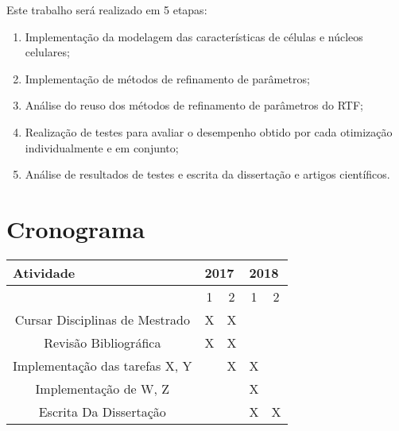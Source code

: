 \documentclass[a4paper,10pt]{article}
\begin{document}
Este trabalho será realizado em 5 etapas:
\begin{enumerate}
	\item Implementação da modelagem das características de células e núcleos celulares;
	\item Implementação de métodos de refinamento de parâmetros;
	\item Análise do reuso dos métodos de refinamento de parâmetros do RTF;
	\item Realização de testes para avaliar o desempenho obtido por cada otimização individualmente e em conjunto;
	\item Análise de resultados de testes e escrita da dissertação e artigos científicos.
\end{enumerate}


\section{Cronograma}
\begin{table}[!h]
	\centering
	\label{my-label}
	\begin{tabular}{|c|c|c|c|c|}
		\hline
		\multicolumn{1}{|l|}{Atividade} & \multicolumn{2}{l|}{2017} & \multicolumn{2}{l|}{2018} \\ \hline
		& 1\degree    & 2\degree    & 1\degree    & 2\degree    \\ \hline
		Cursar Disciplinas de Mestrado  & X           &  X           &             &             \\ \hline
		Revisão Bibliográfica           & X           & X           &             &             \\ \hline
		Implementação das tarefas X, Y  &             & X           & X           &             \\ \hline
		Implementação de W, Z     &             &             & X           &             \\ \hline
		Escrita Da Dissertação          &             &             & X           & X           \\ \hline
	\end{tabular}
\end{table}




\newcommand{\BIBdecl}{\setlength{\itemsep}{0.2 em}}
\linespread{0.9}
	

\end{document}
